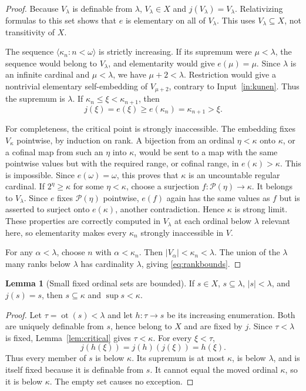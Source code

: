 \documentclass[11pt,letterpaper]{article}
\theoremstyle{definition}
\newtheorem{lemma}[definition]{Lemma}
\numberwithin{equation}{section}
\newcommand{\ot}{\operatorname{ot}}
\newcommand{\Pow}{\mathcal P}
\begin{document}
\begin{proof}
Because $V_\lambda$ is definable from $\lambda$, $V_\lambda\in X$ and $j(V_\lambda)=V_\lambda$. Relativizing formulas to this set shows that $e$ is elementary on all of $V_\lambda$. This uses $V_\lambda\subseteq X$, not transitivity of $X$.

The sequence $\langle\kappa_n:n<\omega\rangle$ is strictly increasing. If its supremum were $\mu<\lambda$, the sequence would belong to $V_\lambda$, and elementarity would give $e(\mu)=\mu$. Since $\lambda$ is an infinite cardinal and $\mu<\lambda$, we have $\mu+2<\lambda$. Restriction would give a nontrivial elementary self-embedding of $V_{\mu+2}$, contrary to Input~\ref{in:kunen}. Thus the supremum is $\lambda$. If $\kappa_n\le\xi<\kappa_{n+1}$, then
\[
 j(\xi)=e(\xi)\ge e(\kappa_n)=\kappa_{n+1}>\xi.
\]

For completeness, the critical point is strongly inaccessible. The embedding fixes $V_\kappa$ pointwise, by induction on rank. A bijection from an ordinal $\eta<\kappa$ onto $\kappa$, or a cofinal map from such an $\eta$ into $\kappa$, would be sent to a map with the same pointwise values but with the required range, or cofinal range, in $e(\kappa)>\kappa$. This is impossible. Since $e(\omega)=\omega$, this proves that $\kappa$ is an uncountable regular cardinal. If $2^\eta\ge\kappa$ for some $\eta<\kappa$, choose a surjection $f:\Pow(\eta)\to\kappa$. It belongs to $V_\lambda$. Since $e$ fixes $\Pow(\eta)$ pointwise, $e(f)$ again has the same values as $f$ but is asserted to surject onto $e(\kappa)$, another contradiction. Hence $\kappa$ is strong limit. These properties are correctly computed in $V_\lambda$ at each ordinal below $\lambda$ relevant here, so elementarity makes every $\kappa_n$ strongly inaccessible in $V$.

For any $\alpha<\lambda$, choose $n$ with $\alpha<\kappa_n$. Then $|V_\alpha|<\kappa_n<\lambda$. The union of the $\lambda$ many ranks below $\lambda$ has cardinality $\lambda$, giving \eqref{eq:rankbounds}.
\end{proof}

\begin{lemma}[Small fixed ordinal sets are bounded]\label{lem:fixedsmall}
If $s\in X$, $s\subseteq\lambda$, $|s|<\lambda$, and $j(s)=s$, then $s\subseteq\kappa$ and $\sup s<\kappa$.
\end{lemma}
\begin{proof}
Let $\tau=\ot(s)<\lambda$ and let $h:\tau\to s$ be its increasing enumeration. Both are uniquely definable from $s$, hence belong to $X$ and are fixed by $j$. Since $\tau<\lambda$ is fixed, Lemma~\ref{lem:critical} gives $\tau<\kappa$. For every $\xi<\tau$,
\[
 j(h(\xi))=j(h)(j(\xi))=h(\xi).
\]
Thus every member of $s$ is below $\kappa$. Its supremum is at most $\kappa$, is below $\lambda$, and is itself fixed because it is definable from $s$. It cannot equal the moved ordinal $\kappa$, so it is below $\kappa$. The empty set causes no exception.
\end{proof}
\end{document}
